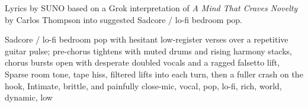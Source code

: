 
\begin{notes}
Lyrics by SUNO based on a Grok interpretation of \emph{A Mind That Craves Novelty} by Carlos Thompson into suggested Sadcore / lo-fi bedroom pop.
\end{notes}
\begin{style}
Sadcore / lo-fi bedroom pop with hesitant low-register verses over a repetitive guitar pulse; pre-chorus tightens with muted drums and rising harmony stacks, chorus bursts open with desperate doubled vocals and a ragged falsetto lift, Sparse room tone, tape hiss, filtered lifts into each turn, then a fuller crash on the hook, Intimate, brittle, and painfully close-mic, vocal, pop, lo-fi, rich, world, dynamic, low
\end{style}
